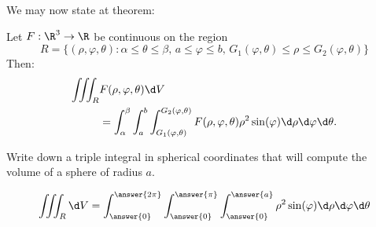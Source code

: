 \documentclass{ximera}
\begin{document}
We may now state at theorem:
\begin{theorem}[Fubini]
  Let $F:\R^3\to\R$ be continuous on the region
  \[
  R=\{(\rho,\varphi,\theta):\text{$\alpha\leq\theta\leq\beta$, $a\leq \varphi\leq b$, $G_1(\varphi,\theta)\le \rho\le G_2(\varphi,\theta)$}\}
  \]
  Then: 
  \begin{align*}
  \iiint_R &F(\rho,\varphi,\theta)\d V\\
  &= \int_\alpha^\beta\int_{a}^{b} \int_{G_1(\varphi,\theta)}^{G_2(\varphi,\theta)}F(\rho,\varphi,\theta) \rho^2 \sin(\varphi)\d\rho\d\varphi\d\theta.
  \end{align*}
\end{theorem}

\begin{question}
  Write down a triple integral in spherical coordinates that will
  compute the volume of a sphere of radius $a$.
  \begin{prompt}
  \[
  \iiint_R \d V = \int_{\answer{0}}^{\answer{2\pi}}
  \int_{\answer{0}}^{\answer{\pi}}
  \int_{\answer{0}}^{\answer{a}}
  \rho^2 \sin(\varphi)\d\rho\d\varphi\d\theta
  \]
  \end{prompt}
\end{question}


        
\end{document}
